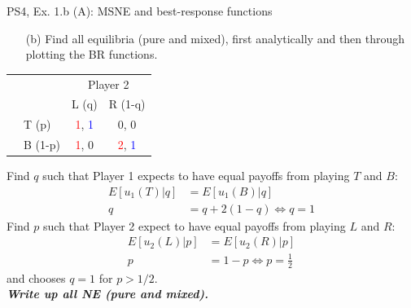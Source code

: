 \begin{frame}{PS4, Ex. 1.b (A): MSNE and best-response functions}
  \begin{multicols}{2}
    \begin{itemize}
      \item[(b)] Find all equilibria (pure and mixed), first analytically and then through plotting the BR functions.
    \end{itemize}
    \begin{table}
      \begin{tabular}{cl|c|c|}
        & \multicolumn{1}{c}{} & \multicolumn{2}{c}{\color{blue}Player 2}\\
        \parbox[t]{1mm}{}
        &  &  &  \\
        & T (p) & \textcolor{red}{1}, \textcolor{blue}{1} & 0, 0 \\
        & B (1-p) & \textcolor{red}{1}, 0 & \textcolor{red}{2}, \textcolor{blue}{1} \\
      \end{tabular}
    \end{table}
    Find $q$ such that Player 1 expects to have equal payoffs from playing $T$ and $B$:
    \begin{align*}
      E[u_1(T)|q]&=E[u_1(B)|q]\\
      q &= q + 2(1-q) \Leftrightarrow q = 1
    \end{align*}
    Find $p$ such that Player 2 expect to have equal payoffs from playing $L$ and $R$:
    \begin{align*}
      E[u_2(L)|p]&=E[u_2(R)|p]\\
      p &= 1-p \Leftrightarrow p = \frac{1}{2}
    \end{align*}
    and chooses $q=1$ for $p>1/2$.\\\medskip
    \textbf{\textit{Write up all NE (pure and mixed).}}
  \vfill\null \columnbreak
  \vfill\null
  \end{multicols}
\end{frame}
